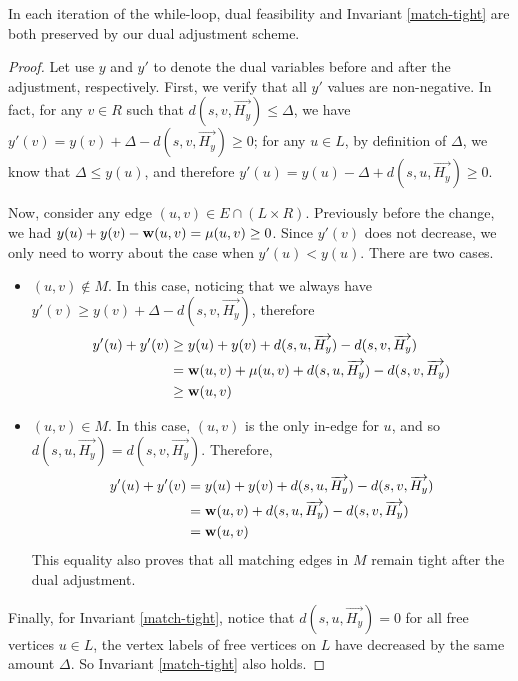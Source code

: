 \begin{lemma}
	In each iteration of the while-loop, dual feasibility and Invariant \ref{match-tight} are both preserved by our dual adjustment scheme.
\end{lemma}
\begin{proof}
	Let use $y$ and $y'$ to denote the dual variables before and after the adjustment, respectively. First, we verify that all $y'$ values are non-negative. In fact, for any $v\in R$ such that $d(s, v, \overrightarrow{H_y}) \leq \Delta$, we have $y'(v) = y(v) + \Delta - d(s, v, \overrightarrow{H_y})\geq 0$; for any $u\in L$, by definition of $\Delta$, we know that $\Delta \leq y(u)$, and therefore $y'(u) = y(u) - \Delta + d(s, u, \overrightarrow{H_y})\geq 0$.
	
	Now, consider any edge $(u, v)\in E\cap (L\times R)$. Previously before the change, we had $y(u) + y(v) - \mathbf{w}(u, v) = \mu(u, v) \geq 0$. Since $y'(v)$ does not decrease, we only need to worry about the case when $y'(u) < y(u)$. There are two cases.
	
	\begin{itemize}
		\item $(u, v)\notin M$. In this case, noticing that we always have $y'(v) \geq y(v) + \Delta - d(s, v, \overrightarrow{H_y})$, therefore
		$$\begin{aligned}
			y'(u) + y'(v) &\geq y(u) + y(v) + d(s, u, \overrightarrow{H_y}) - d(s, v, \overrightarrow{H_y})\\
			&= \mathbf{w}(u, v) + \mu(u, v) +d(s, u, \overrightarrow{H_y}) - d(s, v, \overrightarrow{H_y})\\
			&\geq \mathbf{w}(u, v)
		\end{aligned}$$
		
		\item $(u, v)\in M$. In this case, $(u, v)$ is the only in-edge for $u$, and so $d(s, u, \overrightarrow{H_y}) = d(s, v, \overrightarrow{H_y})$. Therefore, 
		$$\begin{aligned}
			y'(u) + y'(v) &= y(u) + y(v) + d(s, u, \overrightarrow{H_y}) - d(s, v, \overrightarrow{H_y})\\
			&= \mathbf{w}(u, v) +d(s, u, \overrightarrow{H_y}) - d(s, v, \overrightarrow{H_y})\\
			&= \mathbf{w}(u, v)
		\end{aligned}$$
		This equality also proves that all matching edges in $M$ remain tight after the dual adjustment.
	\end{itemize}
	Finally, for Invariant \ref{match-tight}, notice that $d(s, u , \overrightarrow{H_y}) = 0$ for all free vertices $u\in L$, the vertex labels of free vertices on $L$ have decreased by the same amount $\Delta$. So Invariant \ref{match-tight} also holds.
\end{proof}

